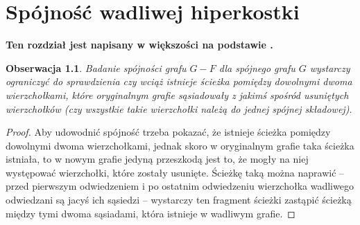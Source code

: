 \documentclass{pracamgr}
\newtheorem{observation}[theorem]{Obserwacja}
\begin{document}
 \chapter{Spójność wadliwej hiperkostki}
  \textbf{Ten rozdział jest napisany w większości na podstawie \cite{DFGKR}.}
  \begin{observation}\label{spojnosc przy usunietych}
   Badanie spójności grafu $G-F$ dla spójnego grafu $G$ wystarczy ograniczyć do sprawdzienia czy wciąż istnieje ścieżka pomiędzy dowolnymi dwoma wierzchołkami,
   które oryginalnym grafie sąsiadowały z jakimś spośród usuniętych wierzchołków (czy wszystkie takie wierzchołki należą do jednej spójnej składowej).
  \end{observation}
  \begin{proof}
   Aby udowodnić spójność trzeba pokazać, że istnieje ścieżka pomiędzy dowolnymi dwoma wierzchołkami, jednak skoro w oryginalnym grafie taka ścieżka istniała,
   to w nowym grafie jedyną przeszkodą jest to, że mogły na niej występować wierzchołki, które zostały usunięte. 
   Ścieżkę taką można naprawić -- przed pierwszym odwiedzeniem i po ostatnim odwiedzeniu wierzchołka wadliwego odwiedzani są jacyś ich sąsiedzi --
   wystarczy ten fragment ścieżki zastąpić ścieżką między tymi dwoma sąsiadami, która istnieje w wadliwym grafie.
  \end{proof}
\end{document}
